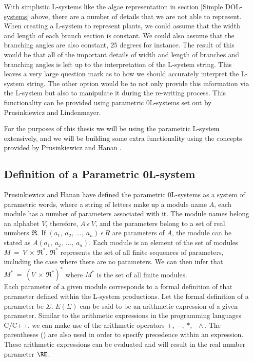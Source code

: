 \begin{flushleft}

With simplistic L-systems like the algae representation in section \ref{Simple DOL-systems} above, there are a number of details that we are not able to represent.\\
When creating a L-system to represent plants, we could assume that the width and length of each branch section is constant. We could also assume that the branching angles are also constant, 25 degrees for instance. The result of this would be that all of the important details of width and length of branches and branching angles is left up to the interpretation of the L-system string. This leaves a very large question mark as to how we should accurately interpret the L-system string. The other option would be to not only provide this information via the L-system but also to manipulate it during the re-writing process. This functionality can be provided using parametric 0L-systems set out by Prusinkiewicz and Lindenmayer. \cite{prusinkiewicz2012algorithmic} \\

\vspace{5mm}

For the purposes of this thesis we will be using the parametric L-system extensively, and we will be building some extra functionality using the concepts provided by Prusinkiewicz and Hanan \cite{prusinkiewicz1990visualization}. \\

\vspace{5mm}

\subsection{Definition of a Parametric 0L-system}

Prusinkiewicz and Hanan have defined the parametric 0L-systems as a system of parametric words, where a string of letters make up a module name $A$, each module has a number of parameters associated with it. The module names belong an alphabet $V$, therefore, $A~ \epsilon~ V$, and the parameters belong to a set of real numbers $\Re$. If $(a_1,~ a_2,~ ...,~ a_n)~ \epsilon~ R$ are parameters of $A$, the module can be stated as $A(a_1,~ a_2,~ ...,~ a_n)$. Each module is an element of the set of modules $M~ =~ V~ \times~ \Re^*$. $\Re^*$ represents the set of all finite sequences of parameters, including the case where there are no parameters. We can then infer that $M^*~ =~ (V~ \times~ \Re^*)^*$ where $M^*$ is the set of all finite modules. \\
Each parameter of a given module corresponds to a formal definition of that parameter defined within the L-system productions. Let the formal definition of a parameter be $\Sigma$. $ E(\Sigma) $ can be said to be an arithmetic expression of a given parameter. Similar to the arithmetic expressions in the programming languages C/C++, we can make use of the arithmetic operators $ +,~ -,~ *,~ \,~ \wedge{}$. The parentheses () are also used in order to specify precedence within an expression. These arithmetic expressions can be evaluated and will result in the real number parameter $\RE$.\\


\end{flushleft}
